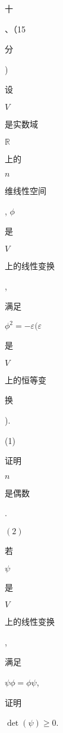 \documentclass[10pt]{article}
\begin{document}
\begin{CJK}{UTF8}{mj}十\end{CJK}、（15 \begin{CJK}{UTF8}{mj}分\end{CJK}) \begin{CJK}{UTF8}{mj}设\end{CJK} $V$ \begin{CJK}{UTF8}{mj}是实数域\end{CJK} $\mathbb{R}$ \begin{CJK}{UTF8}{mj}上的\end{CJK} $n$ \begin{CJK}{UTF8}{mj}维线性空间\end{CJK}, $\phi$ \begin{CJK}{UTF8}{mj}是\end{CJK} $V$ \begin{CJK}{UTF8}{mj}上的线性变换\end{CJK}, \begin{CJK}{UTF8}{mj}满足\end{CJK} $\phi^{2}=-\varepsilon(\varepsilon$ \begin{CJK}{UTF8}{mj}是\end{CJK} $V$ \begin{CJK}{UTF8}{mj}上的恒等变\end{CJK} \begin{CJK}{UTF8}{mj}换\end{CJK}).

(1) \begin{CJK}{UTF8}{mj}证明\end{CJK} $n$ \begin{CJK}{UTF8}{mj}是偶数\end{CJK}.

$(2)$ \begin{CJK}{UTF8}{mj}若\end{CJK} $\psi$ \begin{CJK}{UTF8}{mj}是\end{CJK} $V$ \begin{CJK}{UTF8}{mj}上的线性变换\end{CJK}, \begin{CJK}{UTF8}{mj}满足\end{CJK} $\psi \phi=\phi \psi$, \begin{CJK}{UTF8}{mj}证明\end{CJK} $\operatorname{det}(\psi) \geq 0$.
\end{document}
